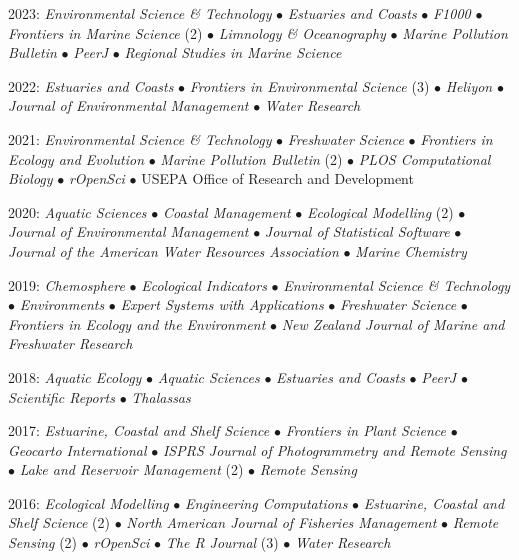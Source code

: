 \documentclass[letterpaper,12pt]{article}
\begin{document}
2023: \textit{Environmental Science \& Technology} $\bullet$ \textit{Estuaries and Coasts} $\bullet$ \textit{F1000} $\bullet$ \textit{Frontiers in Marine Science} (2) $\bullet$ \textit{Limnology \& Oceanography} $\bullet$ \textit{Marine Pollution Bulletin} $\bullet$ \textit{PeerJ} $\bullet$ \textit{Regional Studies in Marine Science}

2022: \textit{Estuaries and Coasts} $\bullet$ \textit{Frontiers in Environmental Science} (3) $\bullet$ \textit{Heliyon} $\bullet$ \textit{Journal of Environmental Management} $\bullet$ \textit{Water Research}

2021: \textit{Environmental Science \& Technology} $\bullet$ \textit{Freshwater Science} $\bullet$ \textit{Frontiers in Ecology and Evolution} $\bullet$ \textit{Marine Pollution Bulletin} (2) $\bullet$ \textit{PLOS Computational Biology} $\bullet$ \textit{rOpenSci} $\bullet$ USEPA Office of Research and Development

2020: \textit{Aquatic Sciences} $\bullet$ \textit{Coastal Management} $\bullet$ \textit{Ecological Modelling} (2) $\bullet$ \textit{Journal of Environmental Management} $\bullet$ \textit{Journal of Statistical Software} $\bullet$ \textit{Journal of the American Water Resources Association} $\bullet$ \textit{Marine Chemistry}

2019: \textit{Chemosphere} $\bullet$ \textit{Ecological Indicators} $\bullet$ \textit{Environmental Science \& Technology} $\bullet$ \textit{Environments} $\bullet$ \textit{Expert Systems with Applications} $\bullet$ \textit{Freshwater Science} $\bullet$ \textit{Frontiers in Ecology and the Environment} $\bullet$ \textit{New Zealand Journal of Marine and Freshwater Research}

2018: \textit{Aquatic Ecology} $\bullet$ \textit{Aquatic Sciences} $\bullet$ \textit{Estuaries and Coasts} $\bullet$ \textit{PeerJ} $\bullet$ \textit{Scientific Reports} $\bullet$ \textit{Thalassas}

2017: \textit{Estuarine, Coastal and Shelf Science} $\bullet$ \textit{Frontiers in Plant Science} $\bullet$ \textit{Geocarto International} $\bullet$ \textit{ISPRS Journal of Photogrammetry and Remote Sensing} $\bullet$ \textit{Lake and Reservoir Management} (2) $\bullet$ \textit{Remote Sensing}

2016: \textit{Ecological Modelling} $\bullet$ \textit{Engineering Computations} $\bullet$ \textit{Estuarine, Coastal and Shelf Science} (2) $\bullet$ \textit{North American Journal of Fisheries Management} $\bullet$ \textit{Remote Sensing} (2) $\bullet$ \textit{rOpenSci} $\bullet$ \textit{The R Journal} (3) $\bullet$ \textit{Water Research}
\end{document}
